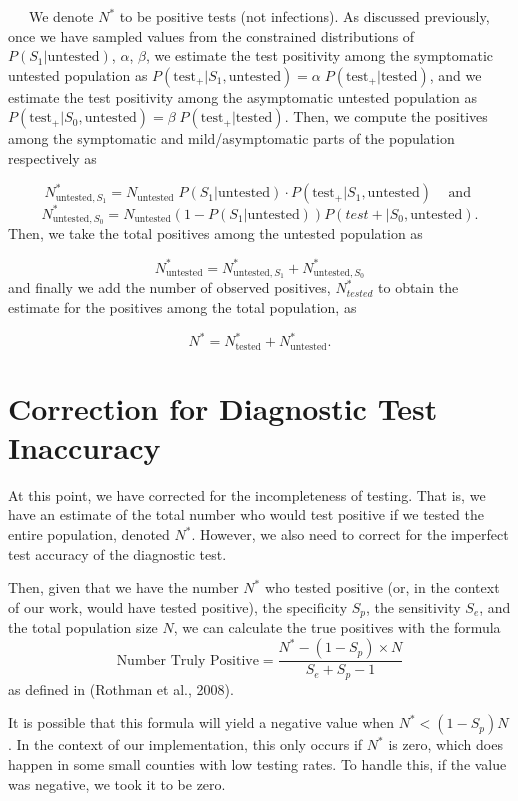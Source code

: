 \documentclass[12pt,twoside]{smiththesis}
\begin{document}
~~~We denote \(N^*\) to be positive tests (not infections). As discussed previously, once we have sampled values from the constrained distributions of \(P(S_1|\text{untested})\), \(\alpha\), \(\beta\), we estimate the test positivity among the symptomatic untested population as \(P(\text{test}_+|S_1,\text{untested}) = \alpha \; P(\text{test}_+|\text{tested})\), and we estimate the test positivity among the asymptomatic untested population as \(P(\text{test}_+|S_0,\text{untested}) = \beta \; P(\text{test}_+|\text{tested})\). Then, we compute the positives among the symptomatic and mild/asymptomatic parts of the population respectively as

\[N^*_{\text{untested},S_1} = N_{\text{untested}} \; P(S_1|\text{untested}) \cdot P(\text{test}_+ | S_1,\text{untested}) \;\;\;\text{ and }\]
\[N^*_{\text{untested},S_0} = N_{\text{untested}}(1-P(S_1|\text{untested}))P(test + | S_0,\text{untested}).\]
Then, we take the total positives among the untested population as

\[N^*_{\text{untested}} = N^*_{\text{untested},S_1} + N^*_{\text{untested},S_0}\]
and finally we add the number of observed positives, \(N^*_{tested}\) to obtain the estimate for the positives among the total population, as

\[N^* = N^*_{\text{tested}} +N^*_{\text{untested}}.\]

\hypertarget{correct-test-inaccuracy}{%
\section{Correction for Diagnostic Test Inaccuracy}\label{correct-test-inaccuracy}}

At this point, we have corrected for the incompleteness of testing. That is, we have an estimate of the total number who would test positive if we tested the entire population, denoted \(N^*\). However, we also need to correct for the imperfect test accuracy of the diagnostic test.

Then, given that we have the number \(N^*\) who tested positive (or, in the context of our work, would have tested positive), the specificity \(S_p\), the sensitivity \(S_e\), and the total population size \(N\), we can calculate the true positives with the formula
\[\text{Number Truly Positive} = \dfrac{N^* - (1-S_p) \times N}{S_e+S_p-1}\]
as defined in (Rothman et al., 2008).

It is possible that this formula will yield a negative value when \(N^* < (1-S_p) N\). In the context of our implementation, this only occurs if \(N^*\) is zero, which does happen in some small counties with low testing rates. To handle this, if the value was negative, we took it to be zero.
\end{document}
